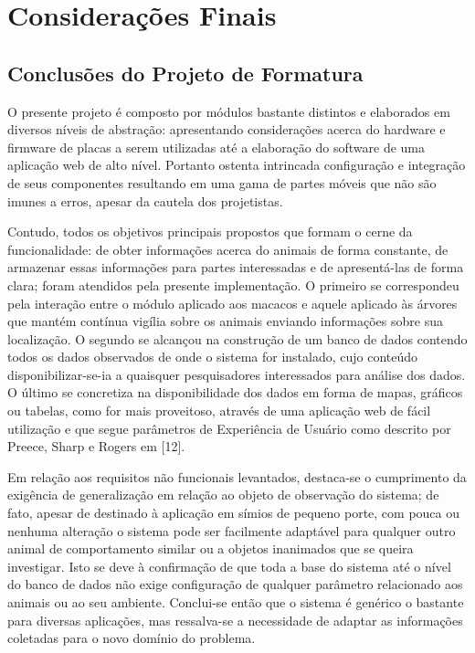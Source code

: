 \chapter{Considerações Finais}

\section{Conclusões do Projeto de Formatura}
O presente projeto é composto por módulos bastante distintos e elaborados em diversos níveis de abstração: apresentando considerações acerca do hardware e firmware de placas a serem utilizadas até a elaboração do software de uma aplicação web de alto nível. Portanto ostenta intrincada configuração e integração de seus componentes resultando em uma gama de partes móveis que não são imunes a erros, apesar da cautela dos projetistas.

Contudo, todos os objetivos principais propostos que formam o cerne da funcionalidade: de obter informações acerca do animais de forma constante, de armazenar essas informações para partes interessadas e de apresentá-las de forma clara; foram atendidos pela presente implementação. O primeiro se correspondeu pela interação entre o módulo aplicado aos macacos e aquele aplicado às árvores que mantém contínua vigília sobre os animais enviando informações sobre sua localização. O segundo se alcançou na construção de um banco de dados contendo todos os dados observados de onde o sistema for instalado, cujo conteúdo disponibilizar-se-ia a quaisquer pesquisadores interessados para análise dos dados. O último se concretiza na disponibilidade dos dados em forma de mapas, gráficos ou tabelas, como for mais proveitoso, através de uma aplicação web de fácil utilização e que segue parâmetros de Experiência de Usuário como descrito por Preece, Sharp e Rogers em [12].

Em relação aos requisitos não funcionais levantados, destaca-se o cumprimento da exigência de generalização em relação ao objeto de observação do sistema; de fato, apesar de destinado à aplicação em símios de pequeno porte, com pouca ou nenhuma alteração o sistema pode ser facilmente adaptável para qualquer outro animal de comportamento similar ou a objetos inanimados que se queira investigar. Isto se deve à confirmação de que toda a base do sistema até o nível do banco de dados não exige configuração de qualquer parâmetro relacionado aos animais ou ao seu ambiente. Conclui-se então que o sistema é genérico o bastante para diversas aplicações, mas ressalva-se a necessidade de adaptar as informações coletadas para o novo domínio do problema.

